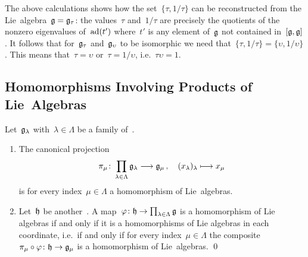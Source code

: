 \begin{example}
  The above calculations shows how the set~$\{ \tau, 1 / \tau \}$ can be reconstructed from the Lie~algebra~$\mathfrak{g} = \mathfrak{g}_\tau$:
  the values~$\tau$ and~$1/\tau$ are precisely the quotients of the nonzero eigenvalues of~$\operatorname{ad}(t')$ where~$t'$ is any element of~$\mathfrak{g}$ not contained in~$[\mathfrak{g}, \mathfrak{g}]$.
  It follows that for~$\mathfrak{g}_\tau$ and~$\mathfrak{g}_\upsilon$ to be isomorphic we need that~$\{ \tau , 1/\tau \} = \{ \upsilon, 1/\upsilon \}$.
  This means that~$\tau = \upsilon$ or~$\tau = 1 / \upsilon$, i.e.~$\tau \upsilon = 1$.
\end{example}



\subsection{Homomorphisms Involving Products of Lie~Algebras}


\begin{proposition}
  \label{products of lie algebras}
  Let~$\mathfrak{g}_\lambda$ with~$\lambda \in \Lambda$ be a family of~\liealgebras{$\kf$}.
  \begin{enumerate}
    \item
      The canonical projection
      \[
       \pi_\mu
       \colon
       \prod_{\lambda \in \Lambda} \glie_\lambda
       \to
       \glie_\mu \,,
       \quad
       ( x_\lambda )_\lambda
       \mapsto
       x_\mu
      \]
      is for every index~$\mu \in \Lambda$ a homomorphism of Lie~algebras.
    \item
      Let~$\mathfrak{h}$ be another~\liealgebra{$\kf$}.
      A map~$\varphi \colon \hlie \to \prod_{\lambda \in \Lambda} \glie$ is a homomorphism of Lie algebras if and only if it is a homomorphisms of Lie algebras in each coordinate, i.e.\ if and only if for every index~$\mu \in \Lambda$ the composite~$\pi_\mu \circ \varphi \colon \hlie \to \glie_\mu$ is a homomorphism of Lie~algebras.
    \qed
  \end{enumerate}
\end{proposition}


